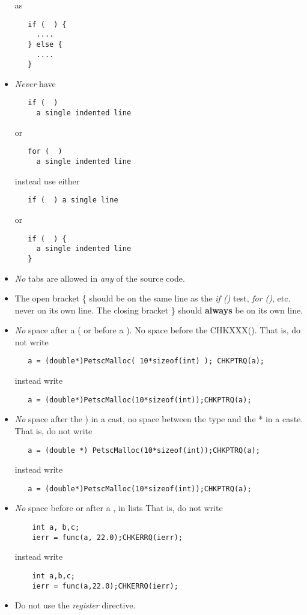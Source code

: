 \documentclass[twoside,12pt]{../sty/report_petsc}
\begin{document}
\begin{itemize}
as
\begin{verbatim}
   if (  ) {
     ....
   } else {
     ....
   }
\end{verbatim}
\item {\em Never}  have 
\begin{verbatim}
   if (  ) 
     a single indented line
\end{verbatim}
or
\begin{verbatim}
   for (  )
     a single indented line
\end{verbatim}
instead use either 
\begin{verbatim}
   if (  ) a single line
\end{verbatim}
or 
\begin{verbatim}
   if (  ) {
     a single indented line
   }
\end{verbatim}
\item {\em No} tabs are allowed in {\em any} of the source code.
\item The open bracket \{ should be on the same line as the {\em if ()} test, {\em for ()}, etc. never on 
      its own line. The closing bracket \} should {\bf always} be on its own line. 
\item {\em No} space after a ( or before a ). No space before the CHKXXX(). That is, do not write
\begin{verbatim}
   a = (double*)PetscMalloc( 10*sizeof(int) ); CHKPTRQ(a);
\end{verbatim}
instead write
\begin{verbatim}
   a = (double*)PetscMalloc(10*sizeof(int));CHKPTRQ(a);
\end{verbatim}
\item {\em No} space after the ) in a cast, no space between the type and the * in a caste.
That is, do not write
\begin{verbatim}
   a = (double *) PetscMalloc(10*sizeof(int));CHKPTRQ(a);
\end{verbatim}
instead write
\begin{verbatim}
   a = (double*)PetscMalloc(10*sizeof(int));CHKPTRQ(a);
\end{verbatim}
\item {\em No} space before or after a , in lists
That is, do not write
\begin{verbatim}
    int a, b,c;
    ierr = func(a, 22.0);CHKERRQ(ierr);
\end{verbatim}
instead write
\begin{verbatim}
    int a,b,c;
    ierr = func(a,22.0);CHKERRQ(ierr);
\end{verbatim}
\item Do not use the {\em register} directive.
\end{itemize}
\end{document}
